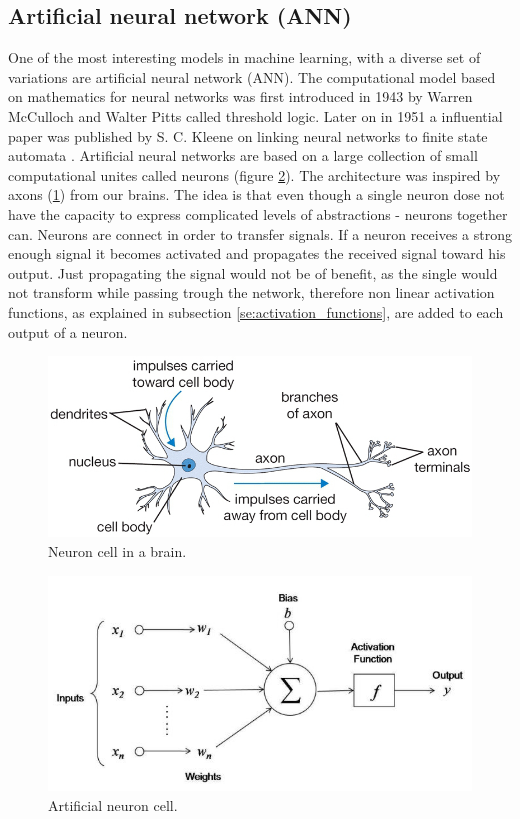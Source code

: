 \documentclass[times, utf8, diplomski]{fer}
\begin{document}
\subsection{Artificial neural network (ANN)}
One of the most interesting models in machine learning, with a diverse set of variations are artificial neural network (ANN). The computational model based on mathematics for neural networks was first introduced in 1943 by Warren McCulloch and Walter Pitts \citep{mcculloch_logical_1943}  called threshold logic. Later on in 1951 a influential paper was published by S. C. Kleene on linking neural networks to finite state automata \citep{kleene_representation_1951}. Artificial neural networks are based on a large collection of small computational unites called neurons (figure  \ref{fig:ann_neuron}). The architecture was inspired by axons (\ref{fig:neuron}) from our brains. The idea is that even though a single neuron dose not have the capacity to express complicated levels of abstractions - neurons together can. Neurons are connect in order to transfer signals. If a neuron receives a strong enough signal it becomes activated and propagates the received signal toward his output. Just propagating the signal would not be of benefit, as the single would not transform while passing trough the network, therefore non linear activation functions, as explained in subsection \ref{se:activation_functions}, are added to each output of a neuron.

\begin{figure}
  \includegraphics[width=\linewidth]{figures/axon.png}
  \caption{Neuron cell in a brain.}
  \label{fig:neuron}
\end{figure}

\begin{figure}
  \includegraphics[width=\linewidth]{figures/neuron.jpg}
  \caption{Artificial neuron cell.}
  \label{fig:ann_neuron}
\end{figure}
\end{document}
